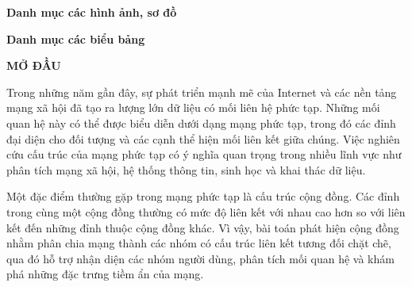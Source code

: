 \documentclass[14pt,a4paper]{extarticle}
\begin{document}
\newcommand{\gobblethree}[3]{}

\newpage
\clearpage

\begin{center}
\textbf{\fontsize{20}{24}\selectfont
Danh mục các hình ảnh, sơ đồ}
\end{center}

\begingroup
    \renewcommand{\listfigurename}{}
    \let\addcontentsline\gobblethree
    \listoffigures
\endgroup

\clearpage

\newpage
\clearpage

\begin{center}
\textbf{\fontsize{20}{24}\selectfont
Danh mục các biểu bảng}
\end{center}
\addcontentsline{toc}{section}{Danh mục các biểu bảng}

\begingroup
    
    \renewcommand{\listtablename}{}

    \let\addcontentsline\gobblethree
    \listoftables
    
\endgroup
\clearpage


\clearpage
{}
\setcounter{page}{1}

\newpage %
\renewcommand{\contentsname}{
    \begin{center}
        \textbf{\fontsize{16pt}{17pt}\selectfont MỤC LỤC}
    \end{center}
}

\tableofcontents
\newpage

\begin{center}
\textbf{\fontsize{20}{24}\selectfont
MỞ ĐẦU}
\end{center}
\addcontentsline{toc}{section}{Mở đầu}

Trong những năm gần đây, sự phát triển mạnh mẽ của Internet và các nền tảng mạng xã hội đã tạo ra lượng lớn dữ liệu có mối liên hệ phức tạp. Những mối quan hệ này có thể được biểu diễn dưới dạng mạng phức tạp, trong đó các đỉnh đại diện cho đối tượng và các cạnh thể hiện mối liên kết giữa chúng. Việc nghiên cứu cấu trúc của mạng phức tạp có ý nghĩa quan trọng trong nhiều lĩnh vực như phân tích mạng xã hội, hệ thống thông tin, sinh học và khai thác dữ liệu.

Một đặc điểm thường gặp trong mạng phức tạp là cấu trúc cộng đồng. Các đỉnh trong cùng một cộng đồng thường có mức độ liên kết với nhau cao hơn so với liên kết đến những đỉnh thuộc cộng đồng khác. Vì vậy, bài toán phát hiện cộng đồng nhằm phân chia mạng thành các nhóm có cấu trúc liên kết tương đối chặt chẽ, qua đó hỗ trợ nhận diện các nhóm người dùng, phân tích mối quan hệ và khám phá những đặc trưng tiềm ẩn của mạng.
\end{document}
